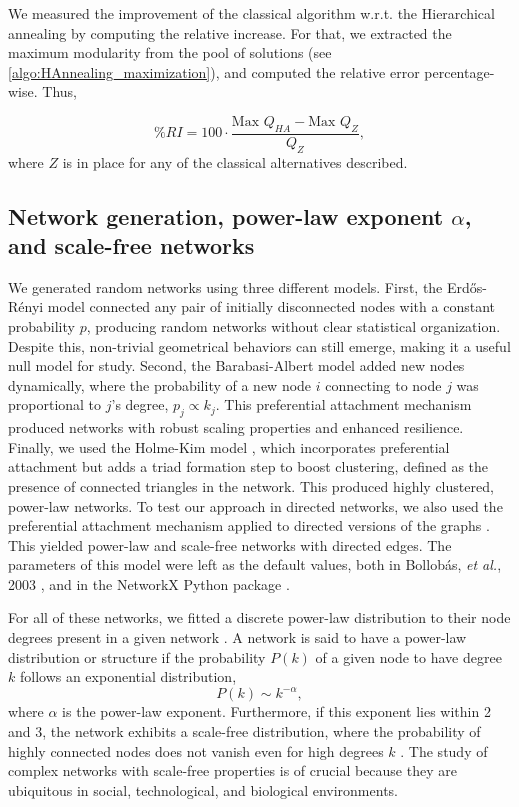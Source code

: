 \documentclass[pdflatex,sn-mathphys-num]{sn-jnl}%
\begin{document}
We measured the improvement of the classical algorithm w.r.t. the Hierarchical annealing by computing the relative increase. For that, we extracted the maximum modularity from the pool of solutions (see \ref{algo:HAnnealing_maximization}), and computed the relative error percentage-wise. Thus,

\begin{equation} \label{eq:increase}
    \%RI = 100 \cdot \frac{\text{Max } Q_{HA} - \text{Max } Q_{Z}}{Q_{Z}},  
\end{equation} where $Z$ is in place for any of the classical alternatives described.

\subsection*{Network generation, power-law exponent $\alpha$, and scale-free networks}
We generated random networks using three different models. First, the Erdős-Rényi model \cite{erdds1959random} connected any pair of initially disconnected nodes with a constant probability $p$, producing random networks without clear statistical organization. Despite this, non-trivial geometrical behaviors can still emerge, making it a useful null model for study. Second, the Barabasi-Albert model \cite{Barabasi1999} added new nodes dynamically, where the probability of a new node $i$ connecting to node $j$ was proportional to $j$'s degree, $p_j \propto k_j$. This preferential attachment mechanism produced networks with robust scaling properties and enhanced resilience. Finally, we used the Holme-Kim model \cite{Holme2002}, which incorporates preferential attachment but adds a triad formation step to boost clustering, defined as the presence of connected triangles in the network. This produced highly clustered, power-law networks. To test our approach in directed networks, we also used the preferential attachment mechanism applied to directed versions of the graphs \cite{bollobas2003}. This yielded power-law and scale-free networks with directed edges. The parameters of this model were left as the default values, both in Bollob\'as, \textit{et al.}, 2003 \cite{bollobas2003}, and in the NetworkX Python package \cite{hagberg2008}.

For all of these networks, we fitted a discrete power-law distribution to their node degrees present in a given network \cite{alstott2014powerlaw}. A network is said to have a power-law distribution or structure if the probability $P(k)$ of a given node to have degree $k$ follows an exponential distribution,
$$P(k)\sim k^{-\alpha},$$
where $\alpha$ is the power-law exponent. Furthermore, if this exponent lies within 2 and 3, the network exhibits a scale-free distribution, where the probability of highly connected nodes does not vanish even for high degrees $k$ \cite{Barabasi1999}. The study of complex networks with scale-free properties is of crucial because they are ubiquitous in social, technological, and biological environments. 
\end{document}
